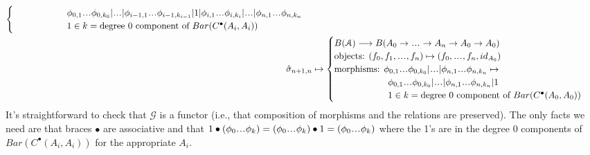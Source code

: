 \begin{align*}
\begin{cases}
  \phantom{{}morphisms: {}} 
	\phi_{0,1}\smdots \phi_{0,k_0} | \smdots |
	\phi_{i-1,1}\smdots \phi_{i-1,k_{i-1}} | 1 |
	\phi_{i,1}\smdots \phi_{i,k_i} | \smdots |
	\phi_{n,1}\smdots\phi_{n,k_n} \\
  \phantom{{}morphisms: {}}	
  	1 \in k =\textrm{degree 0 component of }
  	Bar(C^\bullet(A_i, A_i))
  \end{cases}\\    
%
\hat{\sigma}_{n+1,n}
  &\mapsto 
  \begin{cases}
  B(\mathcal{A}) \longrightarrow 
  B(A_0 \to \smdots \to A_n\to A_0 \to A_0) \\
  \textrm{objects: } (f_0,f_1, \smdots, f_n) \mapsto 
  (f_0, \smdots, f_n, id_{A_0}) \\
  \textrm{morphisms: } \phi_{0,1}\smdots \phi_{0,k_0} | \smdots |
  \phi_{n,1}\smdots\phi_{n,k_n} \mapsto \\
  \phantom{{}morphisms: {}} 
  \phi_{0,1}\smdots \phi_{0,k_0} | \smdots |
  \phi_{n,1}\smdots\phi_{n,k_n} | 1 \\
  \phantom{{}morphisms: {}} 
    1 \in k =\textrm{degree 0 component of }
    Bar(C^\bullet(A_0, A_0))  
  \end{cases}    
\end{align*}
It's straightforward to check that $\mathcal{G}$ is a 
functor (i.e., that composition of morphisms and the relations 
are preserved). The only facts we need are that braces $\bullet$ 
are associative and that $1 \bullet (\phi_0 \smdots \phi_k) = 
(\phi_0 \smdots \phi_k) \bullet 1 = (\phi_0 \smdots \phi_k)$ 
where the 1's are in the degree 0 components of
$Bar(C^\bullet(A_i, A_i))$ for the appropriate $A_i$.